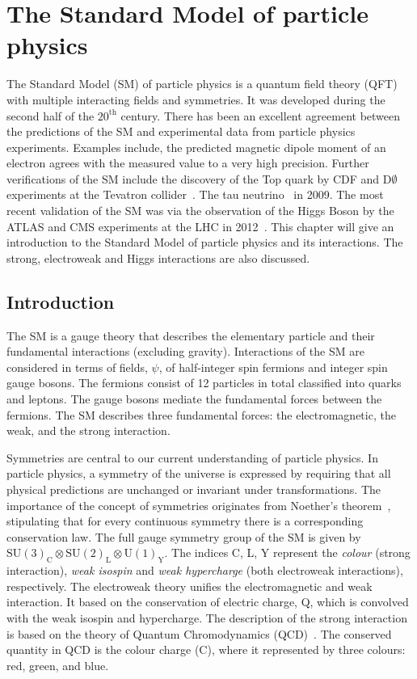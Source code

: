 \def \vacr {{\lvert\mkern1.5mu0\mkern1.5mu\rangle}}
\def \vacl {{\langle\mkern1.5mu0\mkern1.5mu\rvert}}

\chapter{The Standard Model of particle physics}\label{chap:SM}
The Standard Model (SM) of particle physics is a quantum field theory (QFT) with multiple interacting fields and symmetries. It was developed during the second half of the $20^{\mathrm{th}}$ century. There has been an excellent agreement between the predictions of the SM and experimental data from particle physics experiments. Examples include, the predicted magnetic dipole moment of an electron agrees with the measured value to a very high precision. Further verifications of the SM include the discovery of the Top quark by CDF and D$\emptyset$ experiments at the Tevatron \protonproton collider~\cite{Abe1995,Abachi1995}. The tau neutrino~\cite{Kodama_2001} in 2009. The most recent validation of the SM was via the observation of the Higgs Boson by the ATLAS and CMS experiments at the LHC in 2012~\cite{Chatrchyan2012,Aad_2012}. This chapter will give an introduction to the Standard Model of particle physics and its interactions. The strong, electroweak and Higgs interactions are also discussed. 

\section{Introduction}
The SM is a gauge theory that describes the elementary particle and their fundamental interactions (excluding gravity). Interactions of the SM are considered in terms of fields, $\psi$, of half-integer spin fermions and integer spin gauge bosons. The fermions consist of 12 particles in total classified into quarks and leptons. The gauge bosons mediate the fundamental forces between the fermions. The SM describes three fundamental forces: the electromagnetic, the weak, and the strong interaction. 

Symmetries are central to our current understanding of particle physics. In particle physics, a symmetry of the universe is expressed by requiring that all physical predictions are unchanged or invariant under transformations. The importance of the concept of symmetries originates from Noether's theorem~\cite{Noether1918}, stipulating that for every continuous symmetry there is a corresponding conservation law. The full gauge symmetry group of the SM is given by $\mathrm{SU(3)}_\mathrm{C} \otimes \mathrm{SU(2)}_\mathrm{L} \otimes \mathrm{U(1)}_\mathrm{Y}$. The indices C, L, Y represent the \emph{colour} (strong interaction), \emph{weak isospin} and \emph{weak hypercharge} (both electroweak interactions), respectively. The electroweak theory unifies the electromagnetic and weak interaction. It based on the conservation of electric charge, Q, which is convolved with the weak isospin and hypercharge. The description of the strong interaction is based on the theory of Quantum Chromodynamics (QCD)~\cite{Zweig:1964jf}. The conserved quantity in QCD is the colour charge (C), where it represented by three colours: red, green, and blue. 

